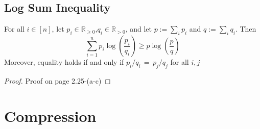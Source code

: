 \subsection{Log Sum Inequality}
For all $ i \in[n]$, let $ p_{i} \in \mathbb{R}_{ \geq 0}$,$ q_{i} \in \mathbb{R}_{>0}$, and let $ p :=\sum_{i} p_{i} $ and $q :=\sum_{i} q_{i}$. Then 
\begin{equation*}
\sum_{i=1}^{n} p_{i} \log (\frac{p_{i}}{q_{i}}) \geq p \log (\frac{p}{q})
\end{equation*}
Moreover, equality holds if and only if $p_i/q_i \, = \, p_j/q_j$ for all $i,j$
\begin{proof}
	Proof on page 2.25-(a-c)
\end{proof}
\section{Compression}
